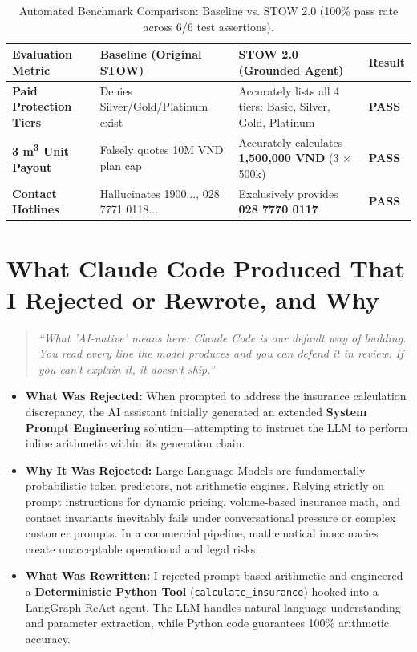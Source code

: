 \documentclass[10pt,a4paper]{article}
\begin{document}
\begin{table}[htbp]
\centering
\footnotesize
\renewcommand{\arraystretch}{1.2}
\begin{tabularx}{\textwidth}{>{\bfseries}p{3cm} >{\raggedright\arraybackslash}X >{\raggedright\arraybackslash}X >{\centering\arraybackslash}p{1.4cm}}
\toprule
Evaluation Metric & Baseline (Original STOW) & STOW 2.0 (Grounded Agent) & Result \\
\midrule
Paid Protection Tiers & Denies Silver/Gold/Platinum exist & Accurately lists all 4 tiers: Basic, Silver, Gold, Platinum & \textbf{PASS} \\
3 m\textsuperscript{3} Unit Payout & Falsely quotes 10M VND plan cap & Accurately calculates \textbf{1,500,000 VND} (3 $\times$ 500k) & \textbf{PASS} \\
Contact Hotlines & Hallucinates 1900..., 028 7771 0118... & Exclusively provides \textbf{028 7770 0117} & \textbf{PASS} \\
\bottomrule
\end{tabularx}
\vspace{-0.3em}
\caption{Automated Benchmark Comparison: Baseline vs. STOW 2.0 (100\% pass rate across 6/6 test assertions).}
\end{table}

\section{What Claude Code Produced That I Rejected or Rewrote, and Why}

\begin{quote}
\footnotesize\itshape
``What 'AI-native' means here: Claude Code is our default way of building. You read every line the model produces and you can defend it in review. If you can't explain it, it doesn't ship.''
\end{quote}

\begin{itemize}
  \item \textbf{What Was Rejected:} When prompted to address the insurance calculation discrepancy, the AI assistant initially generated an extended \textbf{System Prompt Engineering} solution---attempting to instruct the LLM to perform inline arithmetic within its generation chain.
  \item \textbf{Why It Was Rejected:} Large Language Models are fundamentally probabilistic token predictors, not arithmetic engines. Relying strictly on prompt instructions for dynamic pricing, volume-based insurance math, and contact invariants inevitably fails under conversational pressure or complex customer prompts. In a commercial pipeline, mathematical inaccuracies create unacceptable operational and legal risks.
  \item \textbf{What Was Rewritten:} I rejected prompt-based arithmetic and engineered a \textbf{Deterministic Python Tool} (\texttt{calculate\_insurance}) hooked into a LangGraph ReAct agent. The LLM handles natural language understanding and parameter extraction, while Python code guarantees 100\% arithmetic accuracy.
\end{itemize}
\end{document}

